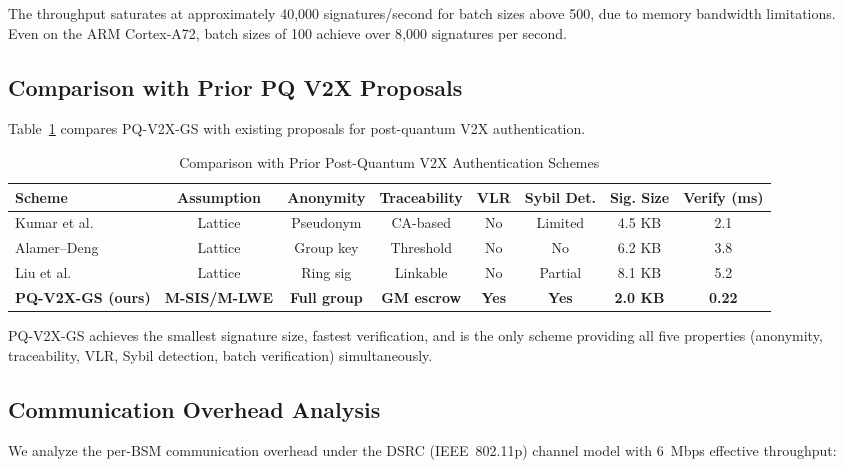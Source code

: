 \documentclass[conference,10pt]{IEEEtran}
\begin{document}
The throughput saturates at approximately 40{,}000 signatures/second for batch sizes above 500, due to memory bandwidth limitations. Even on the ARM Cortex-A72, batch sizes of 100 achieve over 8{,}000 signatures per second.

\subsection{Comparison with Prior PQ V2X Proposals}

Table~\ref{tab:comparison} compares PQ-V2X-GS with existing proposals for post-quantum V2X authentication.

\begin{table}[t]
\centering
\caption{Comparison with Prior Post-Quantum V2X Authentication Schemes}
\label{tab:comparison}
\begin{tabular}{@{}lccccccc@{}}
\toprule
\textbf{Scheme} & \textbf{Assumption} & \textbf{Anonymity} & \textbf{Traceability} & \textbf{VLR} & \textbf{Sybil Det.} & \textbf{Sig. Size} & \textbf{Verify (ms)} \\
\midrule
Kumar et al.~\cite{kumar2022pqv2x}   & Lattice  & Pseudonym   & CA-based    & No  & Limited    & 4.5 KB & 2.1 \\
Alamer--Deng~\cite{alamer2023}        & Lattice  & Group key   & Threshold   & No  & No         & 6.2 KB & 3.8 \\
Liu et al.~\cite{liu2024pqv2x}       & Lattice  & Ring sig    & Linkable    & No  & Partial    & 8.1 KB & 5.2 \\
\textbf{PQ-V2X-GS (ours)}            & \textbf{M-SIS/M-LWE} & \textbf{Full group} & \textbf{GM escrow} & \textbf{Yes} & \textbf{Yes} & \textbf{2.0 KB} & \textbf{0.22} \\
\bottomrule
\end{tabular}
\end{table}

PQ-V2X-GS achieves the smallest signature size, fastest verification, and is the only scheme providing all five properties (anonymity, traceability, VLR, Sybil detection, batch verification) simultaneously.

\subsection{Communication Overhead Analysis}

We analyze the per-BSM communication overhead under the DSRC (IEEE~802.11p) channel model with 6~Mbps effective throughput:
\end{document}
